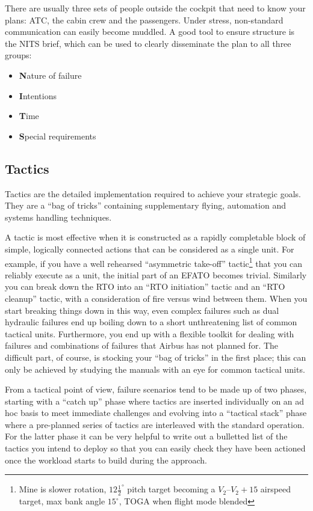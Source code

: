 \documentclass[a5paper,11pt,titlepage]{article}
\begin{document}
There are usually three sets of people outside the cockpit that need to
know your plans: ATC, the cabin crew and the passengers. Under stress,
non-standard communication can easily become muddled. A good tool to
ensure structure is the NITS brief, which can be used to clearly
disseminate the plan to all three groups:

\begin{itemize}
\item \textbf{N}ature of failure
\item \textbf{I}ntentions
\item \textbf{T}ime
\item \textbf{S}pecial requirements
\end{itemize}

\subsection{Tactics}

Tactics are the detailed implementation required to achieve your
strategic goals. They are a ``bag of tricks'' containing supplementary
flying, automation and systems handling techniques.

A tactic is most effective when it is constructed as a rapidly
completable block of simple, logically connected actions that can be
considered as a single unit. For example, if you have a well rehearsed
``asymmetric take-off'' tactic\footnote{Mine is slower rotation,
  $12\frac{1}{2}^\circ$ pitch target becoming a $V_2$--$V_2+15$ airspeed
  target, max bank angle $15^\circ$, TOGA when flight mode blended} that
you can reliably execute as a unit, the initial part of an EFATO becomes
trivial. Similarly you can break down the RTO into an ``RTO initiation''
tactic and an ``RTO cleanup'' tactic, with a consideration of fire
versus wind between them. When you start breaking things down in this
way, even complex failures such as dual hydraulic failures end up
boiling down to a short unthreatening list of common tactical
units. Furthermore, you end up with a flexible toolkit for dealing with
failures and combinations of failures that Airbus has not planned
for. The difficult part, of course, is stocking your ``bag of tricks''
in the first place; this can only be achieved by studying the manuals
with an eye for common tactical units.

From a tactical point of view, failure scenarios tend to be made up of
two phases, starting with a ``catch up'' phase where tactics are
inserted individually on an ad hoc basis to meet immediate challenges
and evolving into a ``tactical stack'' phase where a pre-planned series
of tactics are interleaved with the standard operation. For the latter
phase it can be very helpful to write out a bulletted list of the
tactics you intend to deploy so that you can easily check they have been
actioned once the workload starts to build during the approach.
\end{document}
